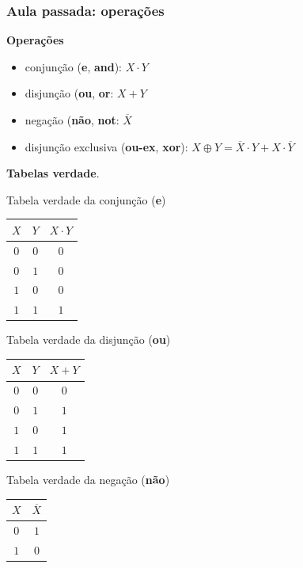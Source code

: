 \documentclass{beamer}
\begin{document}
\begin{frame}
 \frametitle{Aula passada: operações}

\textbf{Operações}
\begin{itemize}
 \item conjunção (\textbf{e}, \textbf{and}): $X \cdot Y$
 \item disjunção (\textbf{ou}, \textbf{or}: $X + Y$
 \item negação (\textbf{não}, \textbf{not}: $\overline{X}$
 \item disjunção exclusiva (\textbf{ou-ex}, \textbf{xor}): $X \oplus Y =
\overline{X} \cdot Y + X \cdot \overline{Y}$
\end{itemize}

\textbf{Tabelas verdade}.\\[12pt]

\begin{center}

\begin{minipage}{16ex}
\centering
Tabela verdade da conjunção (\textbf{e})\\[6pt]
\begin{tabular}{cc|c}
 $X$ & $Y$ & $X \cdot Y$ \\
\hline
 $0$ & $0$ & $0$ \\
 $0$ & $1$ & $0$ \\
 $1$ & $0$ & $0$ \\
 $1$ & $1$ & $1$
\end{tabular}
\end{minipage}
%
\hspace{3ex}
%
\begin{minipage}{18ex}
\centering
Tabela verdade da disjunção  (\textbf{ou})\\[6pt]
\begin{tabular}{cc|c}
 $X$ & $Y$ & $X + Y$ \\
\hline
 $0$ & $0$ & $0$ \\
 $0$ & $1$ & $1$ \\
 $1$ & $0$ & $1$ \\
 $1$ & $1$ & $1$
\end{tabular}
\end{minipage}
%
\hspace{3ex}
%
\begin{minipage}{18ex}
\centering
Tabela verdade da negação  (\textbf{não})\\[12pt]
\begin{tabular}{c|c}
 $X$ & $\overline{X}$ \\
\hline
 $0$ & $1$ \\
 $1$ & $0$
\end{tabular}
\end{minipage}

\end{center}

\end{frame}
\end{document}
